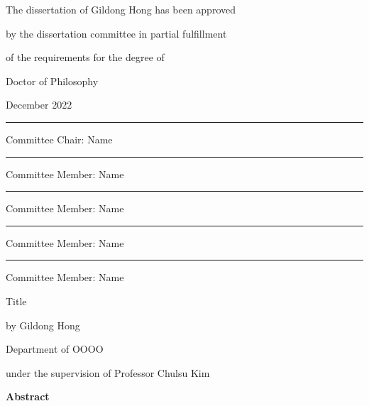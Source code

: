 \documentclass{report}
\begin{document}
\newpage
\begin{center}
\Large
The dissertation of Gildong Hong has been approved \par
by the dissertation committee in partial fulfillment\par
of the requirements for the degree of \par
Doctor of Philosophy  
\par\vspace{1cm}
\large December 2022 %
\par\vspace{2cm}
\rule{.6\textwidth}{0.4pt}\par %
\Large
Committee Chair: Name
\par\vspace{1cm}
\rule{.6\textwidth}{0.4pt}\par %
Committee Member: Name
\par\vspace{1cm}
\rule{.6\textwidth}{0.4pt}\par %
Committee Member: Name 
\par\vspace{1cm}
\rule{.6\textwidth}{0.4pt}\par %
Committee Member: Name 
\par\vspace{1cm}
\rule{.6\textwidth}{0.4pt}\par %
Committee Member: Name 
\par\vspace{1cm} %
\end{center}

\newpage 
{} %
\begin{center}
\LARGE Title %
\par\vspace{20pt}

\normalsize \doublespacing
by Gildong Hong\par %
Department of OOOO\par
under the supervision of Professor Chulsu Kim %
\par\vspace{20pt}
\large \textbf{Abstract}
\end{center}
\end{document}
